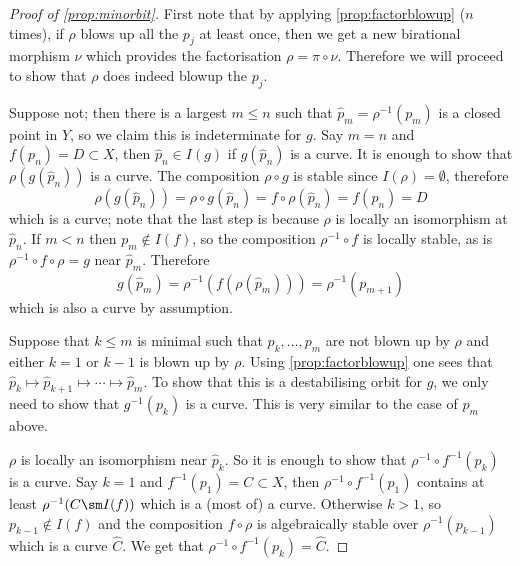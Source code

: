 \documentclass[11pt, final]{amsart}
\newcommand{\nin}{\notin}
\newcommand{\emp}{\emptyset}
\begin{document}
\begin{proof}[Proof of \autoref{prop:minorbit}]
First note that by applying \autoref{prop:factorblowup} ($n$ times), if $\rho$ blows up all the $p_j$ at least once, then we get a new birational morphism $\nu$ which provides the factorisation $\rho = \pi \circ \nu$. Therefore we will proceed to show that $\rho$ does indeed blowup the $p_j$.

Suppose not; then there is a largest $m \le n$ such that $\hat p_m = \rho^{-1}(p_m)$ is a closed point in $Y$, so we claim this is indeterminate for $g$. Say $m = n$ and $f(p_n) = D \subset X$, then $\hat p_n \in I(g)$ if $g(\hat p_n)$ is a curve. It is enough to show that $\rho(g(\hat p_n))$ is a curve. The composition $\rho \circ g$ is stable since $I(\rho) = \emp$, therefore \[\rho(g(\hat p_n)) = \rho \circ g(\hat p_n) = f \circ \rho(\hat p_n) = f(p_n) = D\] which is a curve; note that the last step is because $\rho$ is locally an isomorphism at $\hat p_n$. If $m < n$ then $p_m \nin I(f)$, so the composition $\rho^{-1} \circ f$ is locally stable, as is $\rho^{-1} \circ f \circ \rho = g$ near $\hat p_m$. Therefore \[g(\hat p_m) = \rho^{-1} (f(\rho(\hat p_m))) = \rho^{-1}(p_{m+1})\] which is also a curve by assumption.

Suppose that $k\le m$ is minimal such that $p_k, \dots, p_m$ are not blown up by $\rho$ and either $k=1$ or $k-1$ is blown up by $\rho$. Using \autoref{prop:factorblowup} one sees that $\hat p_k \mapsto \hat p_{k+1} \mapsto \cdots \mapsto \hat p_m$. To show that this is a destabilising orbit for $g$, we only need to show that $g^{-1}(p_k)$ is a curve. This is very similar to the case of $p_m$ above.

$\rho$ is locally an isomorphism near $\hat p_k$. So it is enough to show that $\rho^{-1}\circ f^{-1}(p_k)$ is a curve. Say $k=1$ and $f^{-1}(p_1) = C \subset X$, then $\rho^{-1}\circ f^{-1}(p_1)$ contains at least $\rho^{-1}(C\sm I(f))$ which is a (most of) a curve. Otherwise $k > 1$, so $p_{k-1} \nin I(f)$ and the composition $f \circ \rho$ is algebraically stable over $\rho^{-1}(p_{k-1})$ which is a curve $\hat C$. We get that $\rho^{-1}\circ f^{-1}(p_k) = \hat C$.


\end{proof}
\end{document}
